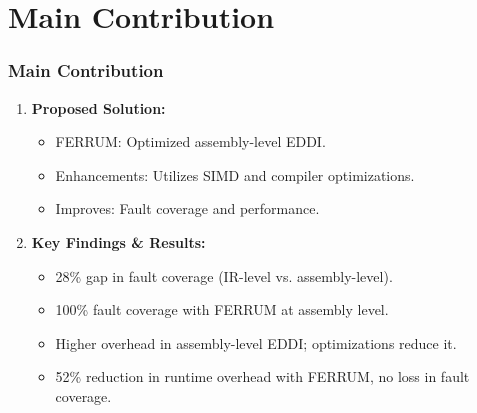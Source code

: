 \documentclass[
	12pt, %
]{beamer}
\begin{document}

\section{Main Contribution}

\begin{frame}
	\frametitle{Main Contribution}
	
	\begin{enumerate}
		\item \textbf{Proposed Solution:}
		\begin{itemize}
			\item FERRUM: Optimized assembly-level EDDI.
			\item Enhancements: Utilizes SIMD and compiler optimizations.
			\item Improves: Fault coverage and performance.
		\end{itemize}
		
		
		\item \textbf{Key Findings \& Results:}
		\begin{itemize}
			\item 28\% gap in fault coverage (IR-level vs. assembly-level).
			\item 100\% fault coverage with FERRUM at assembly level.
			\item Higher overhead in assembly-level EDDI; optimizations reduce it.
			\item 52\% reduction in runtime overhead with FERRUM, no loss in fault coverage.
		\end{itemize}
	\end{enumerate}
	
	
	
	
	
	
	
\end{frame}
\end{document}
